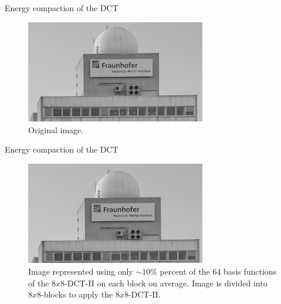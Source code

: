 \begin{frame}{Energy compaction of the DCT}
\begin{figure}
\includegraphics[width=0.70\textwidth]{HHI_gray_ausschnitt.png}
\captionsetup{labelformat=empty}
\caption{Original image.}
\end{figure}
\end{frame}

\begin{frame}{Energy compaction of the DCT}
\begin{figure}
\includegraphics[width=0.70\textwidth]{HHI_gray_trafozero_ausschnitt.png}
\captionsetup{labelformat=empty}
\caption{Image represented using only $\sim 10\%$ percent of the  64 basis functions of the $8x8$-DCT-II on each block on average. Image is divided into $8x8$-blocks to apply the $8x8$-DCT-II. }
\end{figure}
\end{frame}



